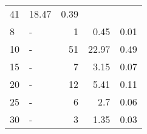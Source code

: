 \begin{longtable}{lXrrr}
       \num{41} &
       \num[round-mode=places,round-precision=2]{18.47} &
         \num[round-mode=places,round-precision=2]{0.39} \\

     8 &
     \multicolumn{1}{X}{ -  } &


       \num{1} &
       \num[round-mode=places,round-precision=2]{0.45} &
         \num[round-mode=places,round-precision=2]{0.01} \\

     10 &
     \multicolumn{1}{X}{ -  } &


       \num{51} &
       \num[round-mode=places,round-precision=2]{22.97} &
         \num[round-mode=places,round-precision=2]{0.49} \\

     15 &
     \multicolumn{1}{X}{ -  } &


       \num{7} &
       \num[round-mode=places,round-precision=2]{3.15} &
         \num[round-mode=places,round-precision=2]{0.07} \\

     20 &
     \multicolumn{1}{X}{ -  } &


       \num{12} &
       \num[round-mode=places,round-precision=2]{5.41} &
         \num[round-mode=places,round-precision=2]{0.11} \\

     25 &
     \multicolumn{1}{X}{ -  } &


       \num{6} &
       \num[round-mode=places,round-precision=2]{2.7} &
         \num[round-mode=places,round-precision=2]{0.06} \\

     30 &
     \multicolumn{1}{X}{ -  } &


       \num{3} &
       \num[round-mode=places,round-precision=2]{1.35} &
         \num[round-mode=places,round-precision=2]{0.03} \\


\end{longtable}
